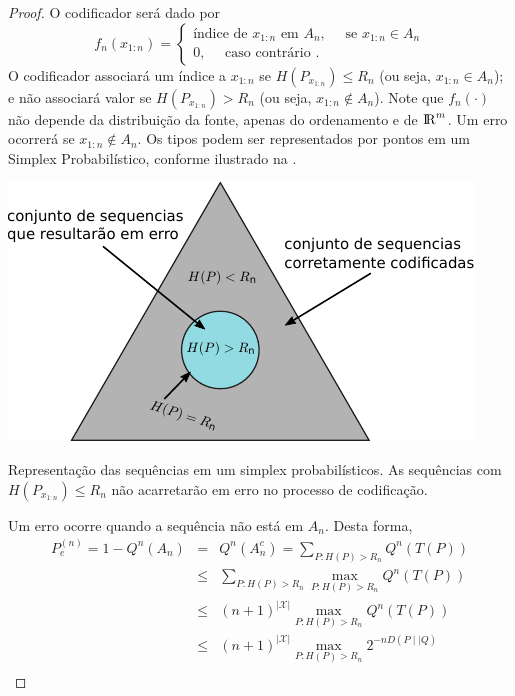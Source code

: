 \begin{proof}
  O codificador será dado por
  \begin{equation}
  f_n (x_{1:n}) =
  \begin{cases}
  \text{índice de } x_{1:n} \text{ em } A_n ,     \quad \text{ se } x_{1:n} \in A_n \\
  0                                       ,       \quad \text{ caso contrário }.
  \end{cases}
  \end{equation}
  O codificador associará um índice a $x_{1:n}$ se $H(P_{x_{1:n}}) \leq  R_n$ (ou seja, $x_{1:n} \in A_n$);
  e não associará valor se $H(P_{x_{1:n}}) >  R_n$ (ou seja, $x_{1:n} \notin A_n$).
  Note que $f_n(\cdot)$ não depende da distribuição da fonte, apenas do ordenamento e de ${\rm I\!R}^m$.
  Um erro ocorrerá se $x_{1:n} \notin A_n$.
  Os tipos podem ser representados por pontos em um Simplex Probabilístico, conforme ilustrado na .
\begin{marginfigure}%
  \includegraphics[width=\linewidth]{figures/type-simplex.pdf}
  \caption{Representação das sequências em um simplex probabilísticos. As sequências com $H(P_{x_{1:n}}) \leq  R_n$ não acarretarão em erro no processo de codificação.}
  \label{fig:type-simplex}
\end{marginfigure}
Um erro ocorre quando a sequência não está em $A_n$. Desta forma,
\begin{subequations}
  \begin{align}
  P_e^{(n)} = 1 - Q^n(A_n) &=& Q^n(A^c_n) = \sum_{P: H(P) > R_n} Q^n (T(P)) \\
        &\leq& \sum_{P: H(P) > R_n} \max_{P: H(P) > R_n} Q^n (T(P)) \\
        &\leq& (n+1)^{\vert \mathcal{X} \vert} \max_{P: H(P) > R_n} Q^n (T(P)) \\
        &\leq& (n+1)^{\vert \mathcal{X} \vert} \max_{P: H(P) > R_n} 2^{-n  D(P \mid\mid Q)} \\

\end{align}
\end{subequations}
\end{proof}
